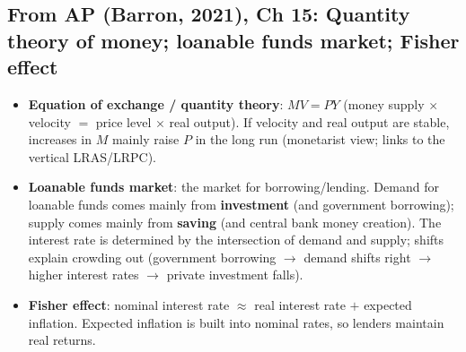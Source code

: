 \documentclass[a4paper,12pt]{article}
\newcommand{\needbold}[1]{\textcolor{red!70!black}{\textbf{#1}}}
\begin{document}
\subsection*{From AP (Barron, 2021), Ch 15: Quantity theory of money; loanable funds market; Fisher effect}\label{sec:add-loanable}
\begin{itemize}
  \item \needbold{Equation of exchange / quantity theory}: $MV = PY$ (money supply $\times$ velocity $=$ price level $\times$ real output). If velocity and real output are stable, increases in $M$ mainly raise $P$ in the long run (monetarist view; links to the vertical LRAS/LRPC).
  \item \needbold{Loanable funds market}: the market for borrowing/lending. Demand for loanable funds comes mainly from \textbf{investment} (and government borrowing); supply comes mainly from \textbf{saving} (and central bank money creation). The interest rate is determined by the intersection of demand and supply; shifts explain crowding out (government borrowing $\to$ demand shifts right $\to$ higher interest rates $\to$ private investment falls).
  \item \needbold{Fisher effect}: nominal interest rate $\approx$ real interest rate $+$ expected inflation. Expected inflation is built into nominal rates, so lenders maintain real returns.
\end{itemize}
\end{document}
